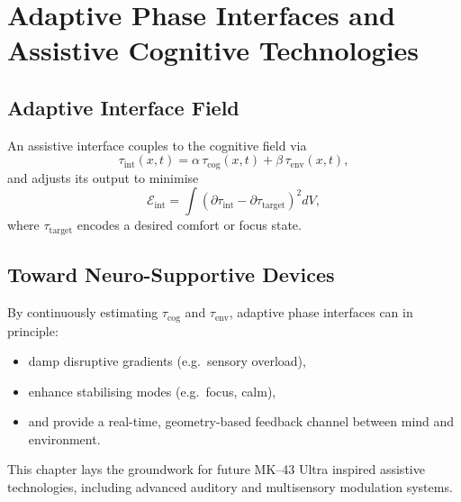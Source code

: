 \chapter{Adaptive Phase Interfaces and Assistive Cognitive Technologies}

\section{Adaptive Interface Field}
An assistive interface couples to the cognitive field via
\[
\tau_{\mathrm{int}}(x,t) = \alpha\,\tau_{\mathrm{cog}}(x,t) + \beta\,\tau_{\mathrm{env}}(x,t),
\]
and adjusts its output to minimise
\[
\mathcal{E}_{\mathrm{int}} = \int (\partial\tau_{\mathrm{int}} - \partial\tau_{\mathrm{target}})^2 dV,
\]
where \(\tau_{\mathrm{target}}\) encodes a desired comfort or focus state.

\section{Toward Neuro-Supportive Devices}
By continuously estimating \(\tau_{\mathrm{cog}}\) and \(\tau_{\mathrm{env}}\), adaptive phase interfaces can in principle:
\begin{itemize}
  \item damp disruptive gradients (e.g.\ sensory overload),
  \item enhance stabilising modes (e.g.\ focus, calm),
  \item and provide a real-time, geometry-based feedback channel between mind and environment.
\end{itemize}
This chapter lays the groundwork for future MK--43 Ultra inspired assistive technologies, including advanced auditory and multisensory modulation systems.
